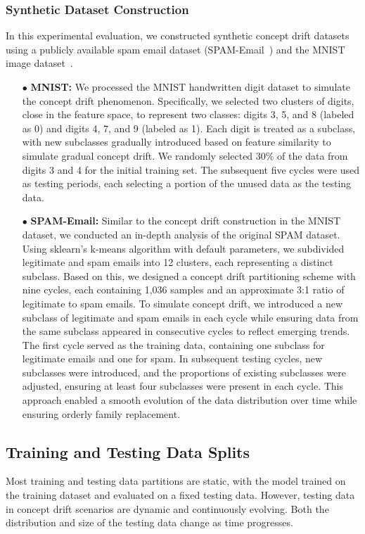 \documentclass[conference,compsoc]{IEEEtran} %
\begin{document}
\subsubsection{Synthetic Dataset Construction}
\label{Sec: Synthetic Concept Drift Dataset Construction}
In this experimental evaluation, we constructed synthetic concept drift datasets using a publicly available spam email dataset (SPAM-Email~\cite{2010-Spam-Emali-dataset}) and the MNIST image dataset~\cite{2017-MINIST-dataset}.

\begin{itemize}[leftmargin=*]
	\item[$\bullet$] \textbf{MNIST:} 
	We processed the MNIST handwritten digit dataset to simulate the concept drift phenomenon. 
	Specifically, we selected two clusters of digits, close in the feature space, to represent two classes: digits 3, 5, and 8 (labeled as 0) and digits 4, 7, and 9 (labeled as 1).
	Each digit is treated as a subclass, with new subclasses gradually introduced based on feature similarity to simulate gradual concept drift.
	We randomly selected 30\% of the data from digits 3 and 4 for the initial training set.
	The subsequent five cycles were used as testing periods, each selecting a portion of the unused data as the testing data.

	\item[$\bullet$] \textbf{SPAM-Email:} 
	Similar to the concept drift construction in the MNIST dataset, we conducted an in-depth analysis of the original SPAM dataset.
	Using sklearn's k-means algorithm with default parameters, we subdivided legitimate and spam emails into 12 clusters, each representing a distinct subclass.
	Based on this, we designed a concept drift partitioning scheme with nine cycles, each containing 1,036 samples and an approximate 3:1 ratio of legitimate to spam emails.
	To simulate concept drift, we introduced a new subclass of legitimate and spam emails in each cycle while ensuring data from the same subclass appeared in consecutive cycles to reflect emerging trends.
	The first cycle served as the training data, containing one subclass for legitimate emails and one for spam. In subsequent testing cycles, new subclasses were introduced, and the proportions of existing subclasses were adjusted, ensuring at least four subclasses were present in each cycle.
	This approach enabled a smooth evolution of the data distribution over time while ensuring orderly family replacement.
\end{itemize}

\subsection{Training and Testing Data Splits}
\label{Sec: Training and Testing Data Splits}
Most training and testing data partitions are static, with the model trained on the training dataset and evaluated on a fixed testing data.
However, testing data in concept drift scenarios are dynamic and continuously evolving.
Both the distribution and size of the testing data change as time progresses.
\end{document}
